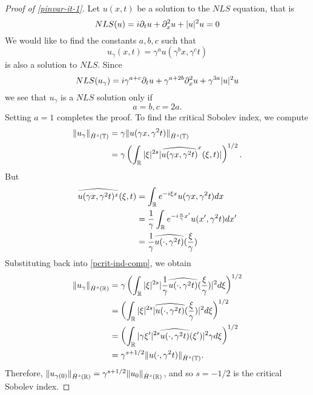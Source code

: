 \begin{proof}[Proof of \eqref{pinvar-it-1}]
Let $u(x, t)$ be a solution to the $NLS$ equation, that is
%
$$
NLS(u)=
i \partial_t u + \partial_x^{2} u  + | u |^{2} u  = 0
$$
%
We would like to find the constants
$a, b, c$ such that
\[
u_\gamma (x, t) = \gamma^a u(\gamma^b x, \gamma^c t)
\]
is also a solution to $NLS$.  Since 
$$
NLS(u_\gamma)=
i \gamma^{a + c} \partial_t u + \gamma^{a + 2b} \partial_x^{2} u  + \gamma^{3a} | u |^{2} u 
$$
we see that $u_\gamma$ is a $NLS$ solution only if
$$
a=b, c = 2a.
$$
Setting $a=1$ completes the proof. 
To find the critical Sobolev index, we compute
%
%
\begin{equation}
\begin{split}
  \| u_{\gamma} \|_{\dot{H}^s(\mathbb{T})} 
  & = \gamma \| u(\gamma x, \gamma^2 t) \|_{\dot{H}^{s}(\mathbb{T})}
  \\
  & = \gamma \left( \int_{\mathbb{R}} | \xi |^{2s} | \widehat{u(\gamma x,
  \gamma^{2} t)}^x (\xi, t)| \right)^{1/2}.
\end{split}
\label{pcrit-ind-comp}
\end{equation}
%
But
%
%
\begin{equation*}
\begin{split}
  \widehat{u(\gamma x, \gamma^{2}t)^x}(\xi, t)
  & = \int_{\mathbb{R}}e^{-i\xi x}u(\gamma x, \gamma^2 t) dx
  \\
  & = \frac{1}{\gamma} \int_{\mathbb{R}}e^{-i \frac{n}{\gamma} x'}u(x',
  \gamma^{2} t) dx'
  \\
  & = \frac{1}{\gamma} \widehat{u(\cdot, \gamma^{2}t)}(\frac{\xi}{\gamma})
\end{split}
\end{equation*}
%
%
Substituting back into \eqref{pcrit-ind-comp}, we obtain
%
%
\begin{equation*}
\begin{split}
  \| u_{\gamma} \|_{\dot{H}^s(\mathbb{R})} 
  & = \gamma\left( \int_{\mathbb{R}} | \xi |^{2s} |
  \frac{1}{\gamma}\widehat{u(\cdot, \gamma^{2}t)}(\frac{\xi}{\gamma}) |^2 d \xi
  \right)^{1/2}
  \\
  & = \left( \int_{\mathbb{R}}| \xi |^{2s} | \widehat{u(\cdot,
  \gamma^{2}t)}(\frac{\xi}{\gamma}) |^2 d \xi  \right)^{1/2}
  \\
  & = \left( \int_{\mathbb{R}} | \gamma \xi' |^{2s} 
  \widehat{u(\cdot, \gamma^{2}t)}(\xi') |^2 \gamma d \xi
  \right)^{1/2}
  \\
  & = \gamma^{s + 1/2} \|u(\cdot, \gamma^{2}t) \|_{\dot{H}^s (\mathbb{T})}.
\end{split}
\end{equation*}
%
%
Therefore, $\| u_{\gamma(0)} \|_{\dot{H}^s(\mathbb{R})} = \gamma^{s + 1/2} \|
u_{0} \|_{\dot{H}^{s}(\mathbb{R})}$, and so $s=-1/2$ is the critical Sobolev index.
\end{proof}
